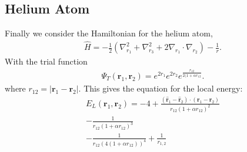\subsection{Helium Atom}
Finally we consider the Hamiltonian for the helium atom,
\begin{align*}
  \hat{H} = -\frac{1}{2}(\nabla_{r_1}^2 + \nabla_{r_3}^2 + 2\nabla_{r_1}\cdot \nabla_{r_2}) - \frac{1}{r}.
\end{align*}
With the trial function
  \begin{align*}
    \Psi_T (\textbf{r}_1,\textbf{r}_2) = e^{2r_1}e^{2r_2}e^{\frac{r_{12}}{2(1+\alpha r_{12}}}.
  \end{align*}
where $r_{12} = |\textbf{r}_1 - \textbf{r}_2 |$.
This gives the equation for the local energy:
  \begin{align*}
    E_L(\textbf{r}_1,\textbf{r}_2) = -4  +
     \frac{(\hat{\textbf{r}}_1 - \hat{\textbf{r}}_2) \cdot (\textbf{r}_1 - \textbf{r}_2)}{r_{12}(1+\alpha r_{12})^2} \\
     -   \frac{1}{r_{12}(1+\alpha r_{12})^3} \\
     - \frac{1}{r_{12}(4(1+\alpha r_{12}))^4} + \frac{1}{r_{1,2}}
  \end{align*}
